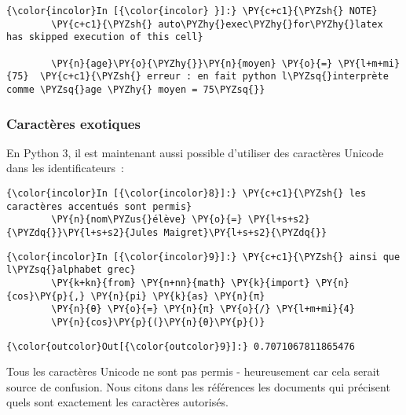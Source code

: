     \begin{Verbatim}[commandchars=\\\{\},frame=single,framerule=0.3mm,rulecolor=\color{cellframecolor}]
{\color{incolor}In [{\color{incolor} }]:} \PY{c+c1}{\PYZsh{} NOTE}
        \PY{c+c1}{\PYZsh{} auto\PYZhy{}exec\PYZhy{}for\PYZhy{}latex has skipped execution of this cell}
        
        \PY{n}{age}\PY{o}{\PYZhy{}}\PY{n}{moyen} \PY{o}{=} \PY{l+m+mi}{75}  \PY{c+c1}{\PYZsh{} erreur : en fait python l\PYZsq{}interprète comme \PYZsq{}age \PYZhy{} moyen = 75\PYZsq{}}
\end{Verbatim}


    \hypertarget{caractuxe8res-exotiques}{%
\subsubsection{Caractères exotiques}\label{caractuxe8res-exotiques}}

    En Python 3, il est maintenant aussi possible d'utiliser des caractères
Unicode dans les identificateurs~:

    \begin{Verbatim}[commandchars=\\\{\},frame=single,framerule=0.3mm,rulecolor=\color{cellframecolor}]
{\color{incolor}In [{\color{incolor}8}]:} \PY{c+c1}{\PYZsh{} les caractères accentués sont permis}
        \PY{n}{nom\PYZus{}élève} \PY{o}{=} \PY{l+s+s2}{\PYZdq{}}\PY{l+s+s2}{Jules Maigret}\PY{l+s+s2}{\PYZdq{}}
\end{Verbatim}


    \begin{Verbatim}[commandchars=\\\{\},frame=single,framerule=0.3mm,rulecolor=\color{cellframecolor}]
{\color{incolor}In [{\color{incolor}9}]:} \PY{c+c1}{\PYZsh{} ainsi que l\PYZsq{}alphabet grec}
        \PY{k+kn}{from} \PY{n+nn}{math} \PY{k}{import} \PY{n}{cos}\PY{p}{,} \PY{n}{pi} \PY{k}{as} \PY{n}{π}
        \PY{n}{θ} \PY{o}{=} \PY{n}{π} \PY{o}{/} \PY{l+m+mi}{4}
        \PY{n}{cos}\PY{p}{(}\PY{n}{θ}\PY{p}{)}
\end{Verbatim}


\begin{Verbatim}[commandchars=\\\{\},frame=single,framerule=0.3mm,rulecolor=\color{cellframecolor}]
{\color{outcolor}Out[{\color{outcolor}9}]:} 0.7071067811865476
\end{Verbatim}
            
    Tous les caractères Unicode ne sont pas permis - heureusement car cela
serait source de confusion. Nous citons dans les références les
documents qui précisent quels sont exactement les caractères autorisés.

